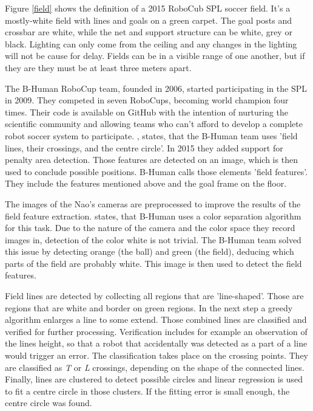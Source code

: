 \documentclass[12pt, a4paper, doc]{apa6}
\begin{document}
  Figure \ref{field} shows the definition of a 2015 RoboCub SPL soccer field. It's a mostly-white field with lines and goals on a green carpet. The goal posts and crossbar are white, while the net and support structure can be white, grey or black. Lighting can only come from the ceiling and any changes in the lighting will not be cause for delay. Fields can be in a visible range of one another, but if they are they must be at least three meters apart.

  The B-Human RoboCup team, founded in 2006, started participating in the SPL in 2009. They competed in seven RoboCups, becoming world champion four times. Their code is available on GitHub with the intention of nurturing the scientific community and allowing teams who can't afford to develop a complete robot soccer system to participate. \cite{bhumanvis}, states, that the B-Human team uses 'field lines, their crossings, and the centre circle'. In 2015 they added support for penalty area detection. Those features are detected on an image, which is then used to conclude possible positions. B-Human calls those elements 'field features'. They include the features mentioned above and the goal frame on the floor.

  The images of the Nao's cameras are preprocessed to improve the results of the field feature extraction. \cite{bhumanvis} states, that B-Human uses a color separation algorithm for this task. Due to the nature of the camera and the color space they record images in, detection of the color white is not trivial. The B-Human team solved this issue by detecting orange (the ball) and green (the field), deducing which parts of the field are probably white. This image is then used to detect the field features.

  Field lines are detected by collecting all regions that are 'line-shaped'. Those are regions that are white and border on green regions. In the next step a greedy algorithm enlarges a line to some extend. Those combined lines are classified and verified for further processing. Verification includes for example an observation of the lines height, so that a robot that accidentally was detected as a part of a line would trigger an error. The classification takes place on the crossing points. They are classified as \emph{T} or \emph{L} crossings, depending on the shape of the connected lines. Finally, lines are clustered to detect possible circles and linear regression is used to fit a centre circle in those clusters. If the fitting error is small enough, the centre circle was found.
\end{document}
